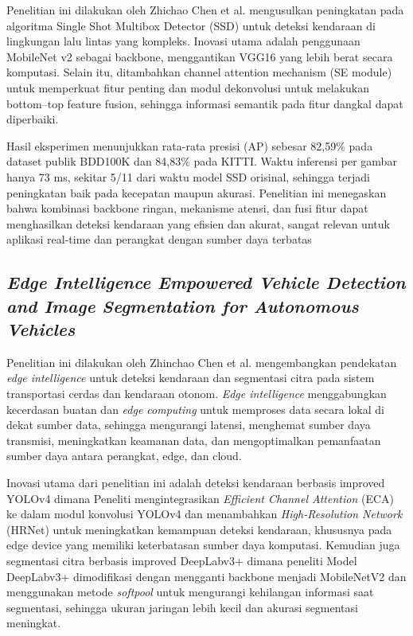 Penelitian ini dilakukan oleh Zhichao Chen et al. \parencite*{Chen2022Fast} mengusulkan peningkatan pada algoritma Single Shot Multibox Detector (SSD) untuk deteksi kendaraan di lingkungan lalu lintas yang kompleks. Inovasi utama adalah penggunaan MobileNet v2 sebagai backbone, menggantikan VGG16 yang lebih berat secara komputasi. Selain itu, ditambahkan channel attention mechanism (SE module) untuk memperkuat fitur penting dan modul dekonvolusi untuk melakukan bottom–top feature fusion, sehingga informasi semantik pada fitur dangkal dapat diperbaiki.

Hasil eksperimen menunjukkan rata-rata presisi (AP) sebesar 82,59\% pada dataset publik BDD100K dan 84,83\% pada KITTI. Waktu inferensi per gambar hanya 73 ms, sekitar 5/11 dari waktu model SSD orisinal, sehingga terjadi peningkatan baik pada kecepatan maupun akurasi. Penelitian ini menegaskan bahwa kombinasi backbone ringan, mekanisme atensi, dan fusi fitur dapat menghasilkan deteksi kendaraan yang efisien dan akurat, sangat relevan untuk aplikasi real-time dan perangkat dengan sumber daya terbatas

\subsection{\emph{Edge Intelligence Empowered Vehicle Detection and Image Segmentation for Autonomous Vehicles}}
\label{subsec:edgeintelligenceempoweredvehicledetection}

Penelitian ini dilakukan oleh Zhinchao Chen et al. \parencite*{Chen2023Edge}mengembangkan pendekatan \emph{edge intelligence} untuk deteksi kendaraan dan segmentasi citra pada sistem transportasi cerdas dan kendaraan otonom. \emph{Edge intelligence} menggabungkan kecerdasan buatan dan \emph{edge computing} untuk memproses data secara lokal di dekat sumber data, sehingga mengurangi latensi, menghemat sumber daya transmisi, meningkatkan keamanan data, dan mengoptimalkan pemanfaatan sumber daya antara perangkat, edge, dan cloud.

Inovasi utama dari penelitian ini adalah deteksi kendaraan berbasis improved YOLOv4 dimana Peneliti mengintegrasikan \emph{Efficient Channel Attention} (ECA) ke dalam modul konvolusi YOLOv4 dan menambahkan \emph{High-Resolution Network} (HRNet) untuk meningkatkan kemampuan deteksi kendaraan, khususnya pada edge device yang memiliki keterbatasan sumber daya komputasi. Kemudian juga segmentasi citra berbasis improved DeepLabv3+ dimana peneliti Model DeepLabv3+ dimodifikasi dengan mengganti backbone menjadi MobileNetV2 dan menggunakan metode \emph{softpool} untuk mengurangi kehilangan informasi saat segmentasi, sehingga ukuran jaringan lebih kecil dan akurasi segmentasi meningkat.

